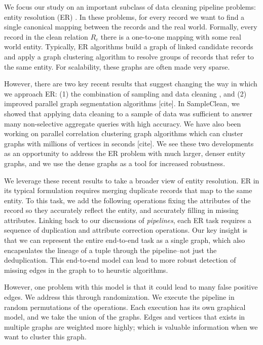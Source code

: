 We focus our study on an important subclass of data cleaning pipeline problems: entity resolution (ER) \cite{DBLP:journals/pvldb/KopckeTR10, conf/dmkd/MongeE97, conf/sigmod/WhangMKTG09, conf/acl/FinkelM08, conf/sigmod/WangLF12, Fellegi1969, conf/sigmod/ArasuGK10, DBLP:journals/tkde/ElmagarmidIV07, journals/tkde/Christen11}. 
In these problems, for every record we want to find a single canonical mapping between the records and the real world.
Formally, every record in the clean relation $R_c$ there is a one-to-one mapping with some real world entity.
Typically, ER algorithms build a graph of linked candidate records and apply a graph clustering algorithm to resolve groups of records that refer to the same entity.
For scalability, these graphs are often made very sparse.

However, there are two key recent results that suggest changing the way in which we approach ER: (1) the combination of sampling and data cleaning \cite{wang1999sample}, and (2) improved parallel graph segmentation algorithms [cite]. 
In SampleClean, we showed that applying data cleaning to a sample of data was sufficient to answer many non-selective aggregate queries with high accuracy. We have also been working on parallel correlation clustering graph algorithms which can cluster graphs with millions of vertices in seconds [cite].
We see these two developments as an opportunity to address the ER problem with much larger, denser entity graphs, and we use the dense graphs as a tool for increased robustness.

We leverage these recent results to take a broader view of entity resolution.
ER in its typical formulation requires merging duplicate records that map to the same entity.
To this task, we add the following operations fixing the attributes of the record so they accurately reflect the entity, and accurately filling in missing attributes.
Linking back to our discussions of \emph{pipelines}, each ER task requires a sequence of duplication and attribute correction operations.
Our key insight is that we can represent the entire end-to-end task as a single graph, which also encapsulates the lineage of a tuple through the pipeline--not just the deduplication.
This end-to-end model can lead to more robust detection of missing edges in the graph to to heurstic algorithms.

However, one problem with this model is that it could lead to many false positive edges.
We address this through randomization.
We execute the pipeline in random permutations of the operations.
Each execution has its own graphical model, and we take the union of the graphs.
Edges and vertices that exists in multiple graphs are weighted more highly; which is valuable information when we want to cluster this graph.

